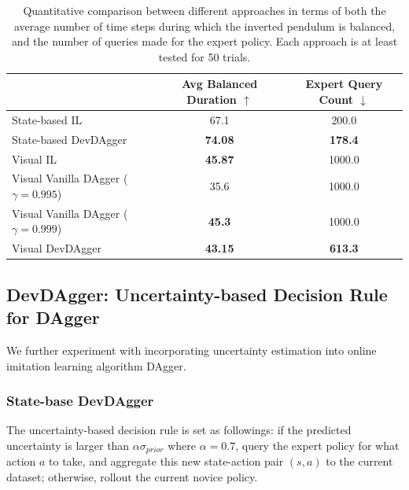 \documentclass[11pt, reqno, letterpaper, twoside]{amsart}
\begin{document}
\begin{table}[ht]
	\centering
	\begin{tabular}{|l|c|c|}
		\hline
		                                         & Avg Balanced Duration $\uparrow$ & Expert Query Count $\downarrow$ \\
		\hline
		State-based IL                           & 67.1                             & 200.0                           \\
		\hline
		State-based DevDAgger                    & \textbf{74.08}                   & \textbf{178.4}                  \\
		\hhline{|=|=|=|}
		Visual IL                                & \textbf{45.87}                   & 1000.0                          \\
		\hline
		Visual Vanilla DAgger ($\gamma = 0.995$) & 35.6                             & 1000.0                          \\
		\hline
		Visual Vanilla DAgger ($\gamma = 0.999$) & \textbf{45.3}                    & 1000.0                          \\
		\hline
		Visual DevDAgger                         & \textbf{43.15}                   & \textbf{613.3}                  \\
		\hline
	\end{tabular}
	\caption{Quantitative comparison between different approaches in terms of both the average number of time steps during which the inverted pendulum is balanced, and the number of queries made for the expert policy. Each approach is at least tested for 50 trials.}
	\label{tab:comparison}
\end{table}

\subsection{DevDAgger: Uncertainty-based Decision Rule for DAgger}
We further experiment with incorporating uncertainty estimation into online imitation learning algorithm DAgger.

\subsubsection{State-base DevDAgger}
The uncertainty-based decision rule is set as followings: if the predicted uncertainty is larger than $\alpha \sigma_{prior}$ where $\alpha=0.7$, query the expert policy for what action $a$ to take, and aggregate this new state-action pair $(s, a)$ to the current dataset; otherwise, rollout the current novice policy.
\end{document}
